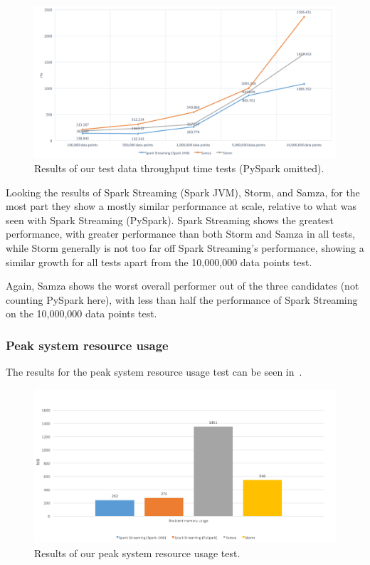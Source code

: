 \begin{figure}[H]
  \centering
  \includegraphics[width=1\textwidth]{includes/figures/fig_throughput_nopyspark_res}
  \caption{Results of our test data throughput time tests (PySpark omitted).}
  \label{fig:throughput_time_res_nopyspark}
\end{figure}

Looking the results of Spark Streaming (Spark JVM), Storm, and Samza, for the most part they show a mostly similar performance
at scale, relative to what was seen with Spark Streaming (PySpark). Spark Streaming shows the greatest performance, with
greater performance than both Storm and Samza in all tests, while Storm generally is not too far off Spark Streaming's
performance, showing a similar growth for all tests apart from the 10,\@000,\@000 data points test.

Again, Samza shows the worst overall performer out of the three candidates (not counting PySpark here), with less than
half the performance of Spark Streaming on the 10,\@000,\@000 data points test.

\subsubsection{Peak system resource usage}

The results for the peak system resource usage test can be seen in~.

\begin{figure}[H]
  \centering
  \includegraphics[width=1\textwidth]{includes/figures/fig_peak_resource_res}
  \caption{Results of our peak system resource usage test.}
  \label{fig:resource_usage_res}
\end{figure}

